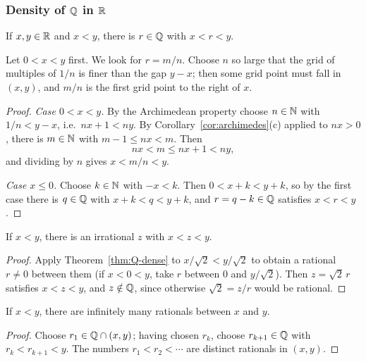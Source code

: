 \subsubsection{Density of \texorpdfstring{$\mathbb{Q}$}{Q} in \texorpdfstring{$\mathbb{R}$}{R}}
\begin{theorem}\label{thm:Q-dense}
    If $x,y\in\mathbb{R}$ and $x < y$, there is $r \in \mathbb{Q}$ with $x < r < y$.
\end{theorem}

Let $0<x<y$ first. We look for $r=m/n$. Choose $n$ so large that the grid
of multiples of $1/n$ is finer than the gap $y-x$; then some grid point must
fall in $(x,y)$, and $m/n$ is the first grid point to the right of $x$.

\begin{proof}
    \emph{Case $0<x<y$.} By the Archimedean property choose $n\in\mathbb{N}$ with
    $1/n<y-x$, i.e.\ $nx+1<ny$. By Corollary~\ref{cor:archimedes}(c) applied
    to $nx>0$, there is $m\in\mathbb{N}$ with $m-1\leq nx<m$. Then
    \begin{equation*}
        nx<m\leq nx+1<ny,
    \end{equation*}
    and dividing by $n$ gives $x<m/n<y$.

    \emph{Case $x\leq0$.} Choose $k\in\mathbb{N}$ with $-x<k$. Then $0<x+k<y+k$, so
    by the first case there is $q\in\mathbb{Q}$ with $x+k<q<y+k$, and $r=q-k\in\mathbb{Q}$
    satisfies $x<r<y$.
\end{proof}

\begin{corollary}
    If $x<y$, there is an irrational $z$ with $x < z < y$.
\end{corollary}

\begin{proof}
    Apply Theorem~\ref{thm:Q-dense} to $x/\sqrt2<y/\sqrt2$ to obtain a
    rational $r\neq0$ between them (if $x<0<y$, take $r$ between $0$ and
    $y/\sqrt2$). Then $z=\sqrt2\,r$ satisfies $x<z<y$, and $z\notin\mathbb{Q}$,
    since otherwise $\sqrt2=z/r$ would be rational.
\end{proof}

\begin{corollary}
    If $x<y$, there are infinitely many rationals between $x$ and $y$.
\end{corollary}

\begin{proof}
    Choose $r_1\in\mathbb{Q}\cap(x,y)$; having chosen $r_k$, choose
    $r_{k+1}\in\mathbb{Q}$ with $r_k<r_{k+1}<y$. The numbers $r_1<r_2<\cdots$ are
    distinct rationals in $(x,y)$.
\end{proof}

